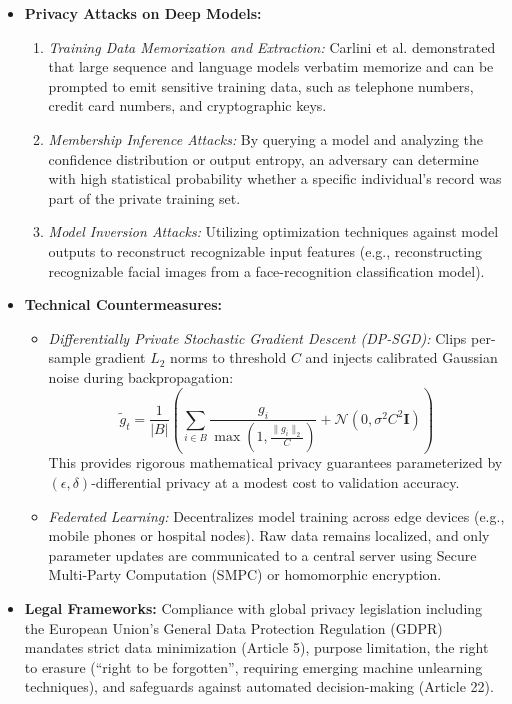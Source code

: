 \documentclass[12pt,a4paper]{article}
\begin{document}
\begin{itemize}[leftmargin=*]
    \item \textbf{Privacy Attacks on Deep Models:}
    \begin{enumerate}
        \item \textit{Training Data Memorization and Extraction:} Carlini et al. demonstrated that large sequence and language models verbatim memorize and can be prompted to emit sensitive training data, such as telephone numbers, credit card numbers, and cryptographic keys.
        \item \textit{Membership Inference Attacks:} By querying a model and analyzing the confidence distribution or output entropy, an adversary can determine with high statistical probability whether a specific individual's record was part of the private training set.
        \item \textit{Model Inversion Attacks:} Utilizing optimization techniques against model outputs to reconstruct recognizable input features (e.g., reconstructing recognizable facial images from a face-recognition classification model).
    \end{enumerate}
    \item \textbf{Technical Countermeasures:}
    \begin{itemize}
        \item \textit{Differentially Private Stochastic Gradient Descent (DP-SGD):} Clips per-sample gradient $L_2$ norms to threshold $C$ and injects calibrated Gaussian noise during backpropagation:
        \[
        \tilde{g}_t = \frac{1}{|B|} \left( \sum_{i \in B} \frac{g_i}{\max\left(1, \frac{\|g_i\|_2}{C}\right)} + \mathcal{N}\left(0, \sigma^2 C^2 \mathbf{I}\right) \right)
        \]
        This provides rigorous mathematical privacy guarantees parameterized by $(\epsilon, \delta)$-differential privacy at a modest cost to validation accuracy.
        \item \textit{Federated Learning:} Decentralizes model training across edge devices (e.g., mobile phones or hospital nodes). Raw data remains localized, and only parameter updates are communicated to a central server using Secure Multi-Party Computation (SMPC) or homomorphic encryption.
    \end{itemize}
    \item \textbf{Legal Frameworks:} Compliance with global privacy legislation including the European Union's General Data Protection Regulation (GDPR) mandates strict data minimization (Article 5), purpose limitation, the right to erasure (``right to be forgotten'', requiring emerging machine unlearning techniques), and safeguards against automated decision-making (Article 22).
\end{itemize}
\end{document}
